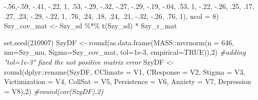 \documentclass[
  english,
]{book}
\newenvironment{Shaded}{\begin{snugshade}}{\end{snugshade}}
\newcommand{\AttributeTok}[1]{\textcolor[rgb]{0.77,0.63,0.00}{#1}}
\newcommand{\CommentTok}[1]{\textcolor[rgb]{0.56,0.35,0.01}{\textit{#1}}}
\newcommand{\ConstantTok}[1]{\textcolor[rgb]{0.00,0.00,0.00}{#1}}
\newcommand{\DecValTok}[1]{\textcolor[rgb]{0.00,0.00,0.81}{#1}}
\newcommand{\FloatTok}[1]{\textcolor[rgb]{0.00,0.00,0.81}{#1}}
\newcommand{\FunctionTok}[1]{\textcolor[rgb]{0.00,0.00,0.00}{#1}}
\newcommand{\NormalTok}[1]{#1}
\newcommand{\OtherTok}[1]{\textcolor[rgb]{0.56,0.35,0.01}{#1}}
\newcommand{\SpecialCharTok}[1]{\textcolor[rgb]{0.00,0.00,0.00}{#1}}
\begin{document}
\begin{Shaded}
\begin{Highlighting}[]
                 \SpecialCharTok{{-}}\NormalTok{.}\DecValTok{56}\NormalTok{,}\SpecialCharTok{{-}}\NormalTok{.}\DecValTok{59}\NormalTok{, }\SpecialCharTok{{-}}\NormalTok{.}\DecValTok{41}\NormalTok{, }\SpecialCharTok{{-}}\NormalTok{.}\DecValTok{22}\NormalTok{, }\DecValTok{1}\NormalTok{,   .}\DecValTok{53}\NormalTok{, }\SpecialCharTok{{-}}\NormalTok{.}\DecValTok{29}\NormalTok{, }\SpecialCharTok{{-}}\NormalTok{.}\DecValTok{32}\NormalTok{,}
                 \SpecialCharTok{{-}}\NormalTok{.}\DecValTok{27}\NormalTok{, }\SpecialCharTok{{-}}\NormalTok{.}\DecValTok{29}\NormalTok{, }\SpecialCharTok{{-}}\NormalTok{.}\DecValTok{19}\NormalTok{, }\SpecialCharTok{{-}}\NormalTok{.}\DecValTok{04}\NormalTok{, .}\DecValTok{53}\NormalTok{, }\DecValTok{1}\NormalTok{, }\SpecialCharTok{{-}}\NormalTok{.}\DecValTok{22}\NormalTok{, }\SpecialCharTok{{-}}\NormalTok{.}\DecValTok{26}\NormalTok{,}
\NormalTok{                  .}\DecValTok{25}\NormalTok{, .}\DecValTok{17}\NormalTok{,  .}\DecValTok{27}\NormalTok{,  .}\DecValTok{23}\NormalTok{,  }\SpecialCharTok{{-}}\NormalTok{.}\DecValTok{29}\NormalTok{, }\SpecialCharTok{{-}}\NormalTok{.}\DecValTok{22}\NormalTok{, }\DecValTok{1}\NormalTok{, .}\DecValTok{76}\NormalTok{,}
\NormalTok{                  .}\DecValTok{24}\NormalTok{,  .}\DecValTok{18}\NormalTok{, .}\DecValTok{24}\NormalTok{, .}\DecValTok{21}\NormalTok{, }\SpecialCharTok{{-}}\NormalTok{.}\DecValTok{32}\NormalTok{,  }\SpecialCharTok{{-}}\NormalTok{.}\DecValTok{26}\NormalTok{, .}\DecValTok{76}\NormalTok{,  }\DecValTok{1}\NormalTok{), }\AttributeTok{ncol =} \DecValTok{8}\NormalTok{)}
\NormalTok{Szy\_cov\_mat }\OtherTok{\textless{}{-}}\NormalTok{ Szy\_sd }\SpecialCharTok{\%*\%} \FunctionTok{t}\NormalTok{(Szy\_sd) }\SpecialCharTok{*}\NormalTok{ Szy\_r\_mat}

\FunctionTok{set.seed}\NormalTok{(}\DecValTok{210907}\NormalTok{)}
\NormalTok{SzyDF }\OtherTok{\textless{}{-}} \FunctionTok{round}\NormalTok{(}\FunctionTok{as.data.frame}\NormalTok{(MASS}\SpecialCharTok{::}\FunctionTok{mvrnorm}\NormalTok{(}\AttributeTok{n =} \DecValTok{646}\NormalTok{, }\AttributeTok{mu=}\NormalTok{Szy\_mu, }\AttributeTok{Sigma=}\NormalTok{Szy\_cov\_mat, }\AttributeTok{tol=}\FloatTok{1e{-}3}\NormalTok{, }\AttributeTok{empirical=}\ConstantTok{TRUE}\NormalTok{)),}\DecValTok{2}\NormalTok{) }\CommentTok{\#adding "tol=1e{-}3" fixed the not positive matrix error}
\NormalTok{SzyDF }\OtherTok{\textless{}{-}} \FunctionTok{round}\NormalTok{(dplyr}\SpecialCharTok{::}\FunctionTok{rename}\NormalTok{(SzyDF, }\AttributeTok{CClimate =}\NormalTok{ V1, }\AttributeTok{CResponse =}\NormalTok{ V2, }\AttributeTok{Stigma =}\NormalTok{ V3, }\AttributeTok{Victimization =}\NormalTok{ V4, }\AttributeTok{CollSat =}\NormalTok{ V5, }\AttributeTok{Persistence =}\NormalTok{ V6, }\AttributeTok{Anxiety =}\NormalTok{ V7, }\AttributeTok{Depression =}\NormalTok{ V8),}\DecValTok{2}\NormalTok{)}
\CommentTok{\#round(cor(SzyDF),2)}
\end{Highlighting}
\end{Shaded}
\end{document}
